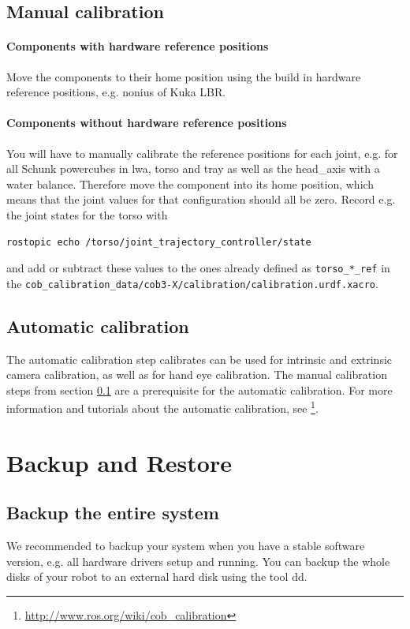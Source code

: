 \subsection{Manual calibration}\label{sec:manual_calibration}

\paragraph{Components with hardware reference positions}
Move the components to their home position using the build in hardware reference positions, e.g. nonius of Kuka LBR.

\paragraph{Components without hardware reference positions}
You will have to manually calibrate the reference positions for each joint, e.g. for all Schunk powercubes in lwa, torso and tray as well as the head\_axis with a water balance. Therefore move the component into its home position, which means that the joint values for that configuration should all be zero. Record e.g. the joint states for the torso with
\begin{lstlisting}
rostopic echo /torso/joint_trajectory_controller/state
\end{lstlisting}
and add or subtract these values to the ones already defined as \texttt{torso\_*\_ref} in the \texttt{cob\_calibration\_data/cob3-X/calibration/calibration.urdf.xacro}.

\subsection{Automatic calibration}
The automatic calibration step calibrates can be used for intrinsic and extrinsic camera calibration, as well as for hand eye calibration. The manual calibration steps from section \ref{sec:manual_calibration} are a prerequisite for the automatic calibration. For more information and tutorials about the automatic calibration, see \footnote{\url{http://www.ros.org/wiki/cob_calibration}}.

\section{Backup and Restore} 
\subsection{Backup the entire system}  
We recommended to backup your system when you have a stable software version, e.g. all hardware drivers setup and running. You can backup the whole disks of your robot to an external hard disk using the tool dd.

